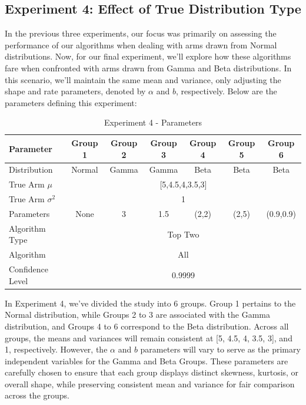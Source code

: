 \documentclass[a4paper, 12pt]{article}
\theoremstyle{definition}
\begin{document}
\subsection{Experiment 4: Effect of True Distribution Type}

In the previous three experiments, our focus was primarily on assessing the performance of our algorithms when dealing with arms drawn from Normal distributions. Now, for our final experiment, we'll explore how these algorithms fare when confronted with arms drawn from Gamma and Beta distributions. In this scenario, we'll maintain the same mean and variance, only adjusting the shape and rate parameters, denoted by $\alpha$ and $b$, respectively. Below are the parameters defining this experiment:

\begin{table}[hbt!]
\centering
\begin{tabular}{lcccccc}
\hline
Parameter & Group 1 & Group 2 & Group 3 & Group 4 & Group 5 & Group 6\\
\hline
Distribution & Normal & Gamma & Gamma & Beta & Beta & Beta \\
True Arm $\mu$ & \multicolumn{6}{c}{[5,4.5,4,3.5,3]} \\
True Arm $\sigma^2$ & \multicolumn{6}{c}{1} \\
Parameters & None & 3 & 1.5 & (2,2) & (2,5) & (0.9,0.9) \\
Algorithm Type & \multicolumn{6}{c}{Top Two} \\
Algorithm & \multicolumn{6}{c}{All} \\
Confidence Level & \multicolumn{6}{c}{0.9999} \\
\hline
\end{tabular}
\caption{Experiment 4 - Parameters}
\label{table:exp4_param}
\end{table}

In Experiment 4, we've divided the study into 6 groups. Group 1 pertains to the Normal distribution, while Groups 2 to 3 are associated with the Gamma distribution, and Groups 4 to 6 correspond to the Beta distribution. Across all groups, the means and variances will remain consistent at [5, 4.5, 4, 3.5, 3], and 1, respectively. However, the $\alpha$ and $b$ parameters will vary to serve as the primary independent variables for the Gamma and Beta Groups. These parameters are carefully chosen to ensure that each group displays distinct skewness, kurtosis, or overall shape, while preserving consistent mean and variance for fair comparison across the groups.
\end{document}
